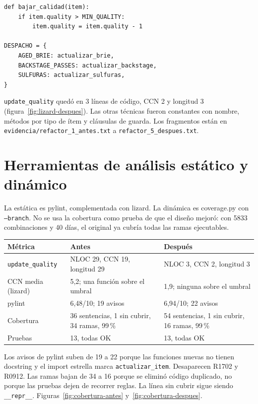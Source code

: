 \documentclass[10pt,a4paper]{article}
\begin{document}
\begin{minipage}{\textwidth}
\begin{lstlisting}
def bajar_calidad(item):
    if item.quality > MIN_QUALITY:
        item.quality = item.quality - 1

DESPACHO = {
    AGED_BRIE: actualizar_brie,
    BACKSTAGE_PASSES: actualizar_backstage,
    SULFURAS: actualizar_sulfuras,
}
\end{lstlisting}
\end{minipage}

\texttt{update\_quality} quedó en 3 líneas de código, CCN 2 y longitud 3 (figura~\ref{fig:lizard-despues}). Las otras técnicas fueron constantes con nombre, métodos por tipo de ítem y cláusulas de guarda. Los fragmentos están en \texttt{evidencia/refactor\_1\_antes.txt} a \texttt{refactor\_5\_despues.txt}.

\section{Herramientas de análisis estático y dinámico}
La estática es pylint, complementada con lizard. La dinámica es coverage.py con \texttt{--branch}. No se usa la cobertura como prueba de que el diseño mejoró: con 5833 combinaciones y 40 días, el original ya cubría todas las ramas ejecutables.

\begin{center}
\scriptsize
\begin{tabular}{|p{4.3cm}|p{5.4cm}|p{5.4cm}|}
\hline
Métrica & Antes & Después \\
\hline
\texttt{update\_quality} & NLOC 29, CCN 19, longitud 29 & NLOC 3, CCN 2, longitud 3 \\
\hline
CCN media (lizard) & 5,2; una función sobre el umbral & 1,9; ninguna sobre el umbral \\
\hline
pylint & 6,48/10; 19 avisos & 6,94/10; 22 avisos \\
\hline
Cobertura & 36 sentencias, 1 sin cubrir, 34 ramas, 99\,\% & 54 sentencias, 1 sin cubrir, 16 ramas, 99\,\% \\
\hline
Pruebas & 13, todas OK & 13, todas OK \\
\hline
\end{tabular}
\end{center}

Los avisos de pylint suben de 19 a 22 porque las funciones nuevas no tienen docstring y el import estrella marca \texttt{actualizar\_item}. Desaparecen R1702 y R0912. Las ramas bajan de 34 a 16 porque se eliminó código duplicado, no porque las pruebas dejen de recorrer reglas. La línea sin cubrir sigue siendo \texttt{\_\_repr\_\_}. Figuras~\ref{fig:cobertura-antes} y~\ref{fig:cobertura-despues}.
\end{document}
